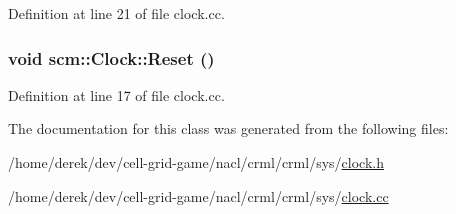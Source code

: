 Definition at line 21 of file clock.cc.

\hypertarget{classscm_1_1_clock_a2cba6acacbe895ce53d40c25bc156427}{
\subsubsection[{Reset}]{\setlength{\rightskip}{0pt plus 5cm}void scm::Clock::Reset ()}}
\label{classscm_1_1_clock_a2cba6acacbe895ce53d40c25bc156427}


Definition at line 17 of file clock.cc.



The documentation for this class was generated from the following files:\begin{DoxyCompactItemize}
\item 
/home/derek/dev/cell-\/grid-\/game/nacl/crml/crml/sys/\hyperlink{clock_8h}{clock.h}\item 
/home/derek/dev/cell-\/grid-\/game/nacl/crml/crml/sys/\hyperlink{clock_8cc}{clock.cc}\end{DoxyCompactItemize}
